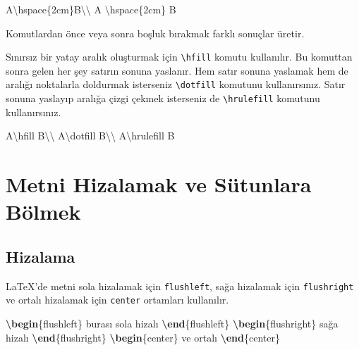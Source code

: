 \documentclass[
  10pt,
]{scrbook}
\newenvironment{Shaded}{\begin{snugshade}}{\end{snugshade}}
\newcommand{\ExtensionTok}[1]{#1}
\newcommand{\FunctionTok}[1]{\textcolor[rgb]{0.00,0.00,0.00}{#1}}
\newcommand{\KeywordTok}[1]{\textcolor[rgb]{0.13,0.29,0.53}{\textbf{#1}}}
\newcommand{\NormalTok}[1]{#1}
\theoremstyle{definition}
\theoremstyle{definition}
\theoremstyle{definition}
\theoremstyle{definition}
\theoremstyle{remark}
\begin{document}
\begin{Shaded}
\begin{Highlighting}[]
\NormalTok{A}\FunctionTok{\textbackslash{}hspace}\NormalTok{\{2cm\}B}\FunctionTok{\textbackslash{}\textbackslash{}}
\NormalTok{A }\FunctionTok{\textbackslash{}hspace}\NormalTok{\{2cm\} B}
\end{Highlighting}
\end{Shaded}

Komutlardan önce veya sonra boşluk bırakmak farklı sonuçlar üretir.

Sınırsız bir yatay aralık oluşturmak için \texttt{\textbackslash{}hfill} komutu kullanılır. Bu komuttan sonra gelen her şey satırın sonuna yaslanır. Hem satır sonuna yaslamak hem de aralığı noktalarla doldurmak isterseniz \texttt{\textbackslash{}dotfill} komutunu kullanırsınız. Satır sonuna yaslayıp aralığa çizgi çekmek isterseniz de \texttt{\textbackslash{}hrulefill} komutunu kullanırsınız.

\begin{Shaded}
\begin{Highlighting}[]
\NormalTok{A}\FunctionTok{\textbackslash{}hfill}\NormalTok{ B}\FunctionTok{\textbackslash{}\textbackslash{}}
\NormalTok{A}\FunctionTok{\textbackslash{}dotfill}\NormalTok{ B}\FunctionTok{\textbackslash{}\textbackslash{}}
\NormalTok{A}\FunctionTok{\textbackslash{}hrulefill}\NormalTok{ B}
\end{Highlighting}
\end{Shaded}

\hypertarget{metni-hizalamak-ve-suxfctunlara-buxf6lmek}{%
\section{Metni Hizalamak ve Sütunlara Bölmek}\label{metni-hizalamak-ve-suxfctunlara-buxf6lmek}}

\hypertarget{hizalama}{%
\subsection{Hizalama}\label{hizalama}}

LaTeX'de metni sola hizalamak için \texttt{flushleft}, sağa hizalamak için \texttt{flushright} ve ortalı hizalamak için \texttt{center} ortamları kullanılır.

\begin{Shaded}
\begin{Highlighting}[]
\KeywordTok{\textbackslash{}begin}\NormalTok{\{}\ExtensionTok{flushleft}\NormalTok{\}}
\NormalTok{ burası sola hizalı}
\KeywordTok{\textbackslash{}end}\NormalTok{\{}\ExtensionTok{flushleft}\NormalTok{\}}
\KeywordTok{\textbackslash{}begin}\NormalTok{\{}\ExtensionTok{flushright}\NormalTok{\}}
\NormalTok{ sağa hizalı}
\KeywordTok{\textbackslash{}end}\NormalTok{\{}\ExtensionTok{flushright}\NormalTok{\}}
\KeywordTok{\textbackslash{}begin}\NormalTok{\{}\ExtensionTok{center}\NormalTok{\}}
\NormalTok{ ve ortalı}
\KeywordTok{\textbackslash{}end}\NormalTok{\{}\ExtensionTok{center}\NormalTok{\}}
\end{Highlighting}
\end{Shaded}
\end{document}
